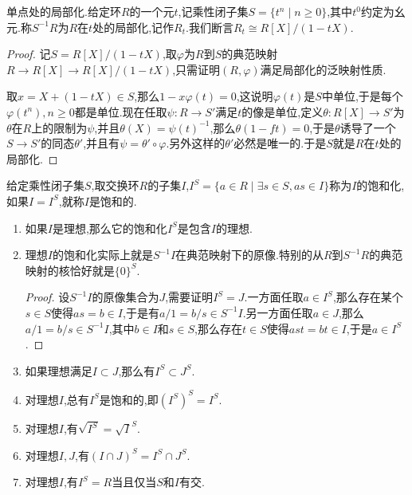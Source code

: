 单点处的局部化.给定环$R$的一个元$t$,记乘性闭子集$S=\{t^n\mid n\ge0\}$,其中$t^0$约定为幺元.称$S^{-1}R$为$R$在$t$处的局部化,记作$R_t$.我们断言$R_t\cong R[X]/(1-tX)$.
\begin{proof}
	
	记$S=R[X]/(1-tX)$,取$\varphi$为$R$到$S$的典范映射$R\to R[X]\to R[X]/(1-tX)$,只需证明$(R,\varphi)$满足局部化的泛映射性质.
	
	取$x=X+(1-tX)\in S$,那么$1-x\varphi(t)=0$,这说明$\varphi(t)$是$S$中单位,于是每个$\varphi(t^n),n\ge0$都是单位.现在任取$\psi:R\to S'$满足$t$的像是单位,定义$\theta:R[X]\to S'$为$\theta$在$R$上的限制为$\psi$,并且$\theta(X)=\psi(t)^{-1}$,那么$\theta(1-ft)=0$,于是$\theta$诱导了一个$S\to S'$的同态$\theta'$,并且有$\psi=\theta'\circ\varphi$.另外这样的$\theta'$必然是唯一的.于是$S$就是$R$在$t$处的局部化.
\end{proof}

给定乘性闭子集$S$,取交换环$R$的子集$I$,$I^S=\{a\in R\mid\exists s\in S,as\in I\}$称为$I$的饱和化,如果$I=I^S$,就称$I$是饱和的.
\begin{enumerate}
	\item 如果$I$是理想,那么它的饱和化$I^S$是包含$I$的理想.
	\item 理想$I$的饱和化实际上就是$S^{-1}I$在典范映射下的原像.特别的从$R$到$S^{-1}R$的典范映射的核恰好就是$\{0\}^S$.
	\begin{proof}
		
		设$S^{-1}I$的原像集合为$J$,需要证明$I^S=J$.一方面任取$a\in I^S$,那么存在某个$s\in S$使得$as=b\in I$,于是有$a/1=b/s\in S^{-1}I$.另一方面任取$a\in J$,那么$a/1=b/s\in S^{-1}I$,其中$b\in I$和$s\in S$,那么存在$t\in S$使得$ast=bt\in I$,于是$a\in I^S$.
	\end{proof}
	\item 如果理想满足$I\subset J$,那么有$I^S\subset J^S$.
	\item 对理想$I$,总有$I^S$是饱和的,即$(I^S)^S=I^S$.
	\item 对理想$I$,有$\sqrt{I^S}=\sqrt{I}^S$.
	\item 对理想$I,J$,有$(I\cap J)^S=I^S\cap J^S$.
	\item 对理想$I$,有$I^S=R$当且仅当$S$和$I$有交.
\end{enumerate}

